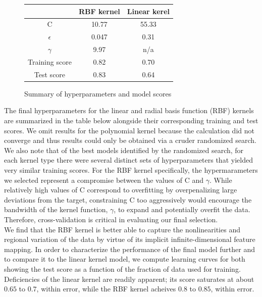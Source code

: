 \documentclass[12]{article}
\begin{document}
\begin{figure}[H]
\centering
\begin{tabular}{ |c|c|c| } 
 \hline
       & \textbf{RBF kernel} & \textbf{Linear kerel} \\ 
 \hline
 C              & 10.77 & 55.33 \\ 
 $\epsilon$     & 0.047 & 0.31 \\
 $\gamma$       & 9.97 & n/a \\
 Training score & 0.82 & 0.70 \\
 Test score     & 0.83 & 0.64 \\
 \hline
\end{tabular}
\caption{\label{fig:Results}Summary of hyperparameters and model scores}
\end{figure}

\noindent The final hyperparameters for the linear and radial basis function (RBF) kernels are summarized in the table below alongside their corresponding training and test scores. We omit results for the polynomial kernel because the calculation did not converge and thus results could only be obtained via a cruder randomized search. We also note that of the best models identified by the randomized search, for each kernel type there were several distinct sets of hyperparameters that yielded very similar training scores. For the RBF kernel specifically, the hypermarameters we selected represent a compromise between the values of C and $\gamma$. While relatively high values of C correspond to overfitting by overpenalizing large deviations from the target, constraining C too aggressively would encourage the bandwidth of the kernel function, $\gamma$, to expand and potentially overfit the data. Therefore, cross-validation is critical in evaluating our final selection.\\  

\noindent We find that the RBF kernel is better able to capture the nonlinearities and regional variation of the data by virtue of its implicit infinite-dimensional feature mapping. In order to characterize the performance of the final model further and to compare it to the linear kernel model, we compute learning curves for both showing the test score as a function of the fraction of data used for training. Deficiencies of the linear kernel are readily apparent; its score saturates at about $0.65$ to $0.7$, within error, while the RBF kernel acheives $0.8$ to $0.85$, within error. 
\end{document}
